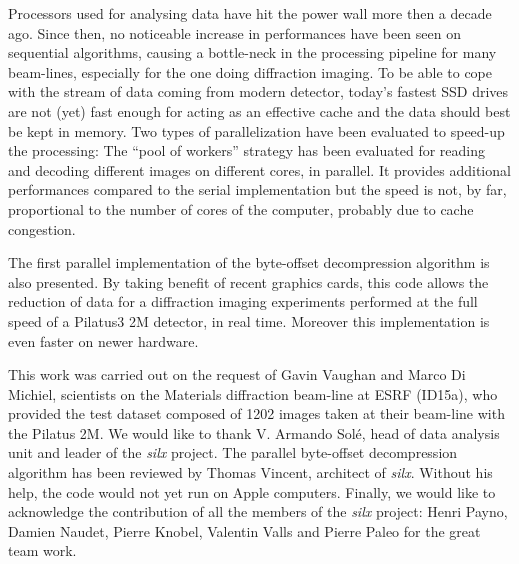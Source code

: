 \documentclass[preprint]{iucr}              %
\begin{document}
Processors used for analysing data have hit the power wall more then
a  decade ago.
Since then,  no noticeable increase in performances have been seen on
sequential algorithms, causing a bottle-neck in the processing
pipeline for many beam-lines, especially for the one doing diffraction imaging.
To be able to cope with the stream of data coming from modern detector,
today's fastest SSD drives are not (yet) fast  enough for acting as an
effective cache and the data should best be kept in memory.
Two types of parallelization have been evaluated to speed-up the processing:  
The ``pool of workers'' strategy has been evaluated for reading and decoding
different images on different cores, in parallel.
It provides additional performances compared to the serial implementation but
the speed is not, by far, proportional to the number of cores of the computer,
probably due to cache congestion.

The first parallel implementation of the byte-offset decompression 
algorithm is also presented. 
By taking benefit of recent graphics cards, this code allows the reduction
of data for a diffraction imaging experiments performed at the full speed of
a Pilatus3 2M detector, in real time. 
Moreover this implementation is even faster on newer hardware. 

 
This work was carried out on the request of Gavin Vaughan and Marco Di
Michiel, scientists on the Materials diffraction beam-line at ESRF (ID15a), who
provided the test dataset composed of 1202 images taken at their beam-line with
the Pilatus 2M.
We would like to thank V. Armando Solé, head of data analysis unit and leader
of the \textit{silx} project. 
The parallel byte-offset decompression algorithm has been reviewed by Thomas
Vincent, architect of \textit{silx}. Without his help, the code would not yet
run on Apple computers.
Finally, we would like to acknowledge the contribution of all the members of
the \textit{silx} project:
Henri Payno, Damien Naudet, Pierre Knobel, Valentin Valls and
Pierre Paleo for the great team work.



\end{document}
